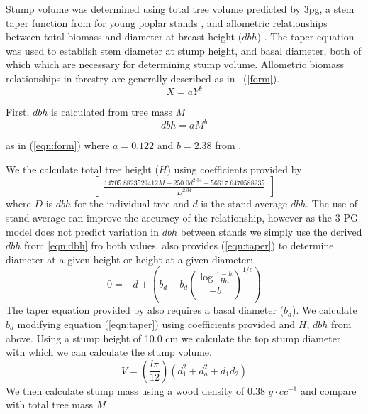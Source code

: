 \documentclass[10pt]{article}
\begin{document}
Stump volume was determined using total tree volume predicted by \ac{3pg},
a stem taper function from for young poplar stands
\cite{Benbrahim2003} , and allometric relationships between total
biomass and diameter at breast height ($dbh$) \cite{Brahim2000}. The
taper equation was used to establish stem diameter at stump height,
and basal diameter, both of which which are necessary for determining
stump volume. Allometric biomass relationships in forestry are
generally described as in ~(\ref{form}).
\begin{equation}
  \label{eq:form}
  X=aY^b
\end{equation}

First, $dbh$ is calculated from tree mass $M$
\begin{equation}
    \label{eqn:dbh}
    dbh=aM^b
    \end{equation}

as in (\ref{eqn:form}) where $a=0.122$ and $b=2.38$ from \cite{Landsberg1997}.

We the calculate total tree height ($H$) using coefficients provided by \cite{Brahim2000}
\begin{equation}
    \label{eqn:height}
    \begin{bmatrix}\frac{14705.8823529412 M + 250.0 d^{2.34} -56617.6470588235}{D^{2.34}}\end{bmatrix}
    \end{equation}where $D$ is $dbh$ for the individual tree and $d$ is the stand average $dbh$. The use of stand average can improve the accuracy of the relationship, however as the 3-PG model does not predict variation in $dbh$ between stands we simply use the derived $dbh$ from \ref{eqn:dbh} fro both values. \cite{Benbrahim2003} also provides (\ref{eqn:taper}) to determine diameter at a given height or height at a given diameter:
\begin{equation}
    \label{eqn:taper}
    0=-d+\left(b_d-b_d\left(\frac{\log{\frac{1-h}{Ha}}}{-b}\right)^{1/c}\right)
    \end{equation}The taper equation provided by \cite{Benbrahim2003} also requires a basal diameter ($b_d$). We calculate $b_d$ modifying equation (\ref{eqn:taper}) using coefficients provided and $H$, $dbh$ from above. Using a stump height of 10.0 cm we calculate the top stump diameter with which we can calculate the stump volume.
\begin{equation}
    \label{eqn:sectionvolume}
    V=\left(\frac{l\pi}{12}\right)(d_1^2+d_a^2+d_1d_2)
    \end{equation}We then calculate stump mass using a wood density of 0.38 $g \cdot cc^{-1}$ and compare with total tree mass $M$
\end{document}
